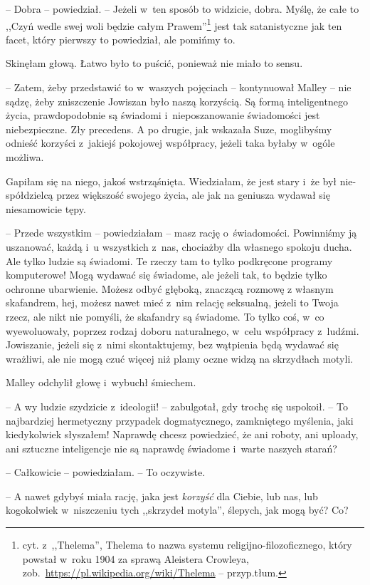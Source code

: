 \documentclass[oneside,polish,11pt,sfheadings]{mwbk}
\begin{document}
-- Dobra -- powiedział. -- Jeżeli w~ten sposób to widzicie,
dobra. Myślę, że całe to ,,Czyń wedle swej woli będzie całym
Prawem''\footnote{cyt. z~,,Thelema'', Thelema to nazwa systemu
religijno-filozoficznego, który powstał w~roku 1904 za sprawą Aleistera
Crowleya, zob.~\url{https://pl.wikipedia.org/wiki/Thelema} -- przyp.tłum.} jest tak satanistyczne jak ten facet, który pierwszy to
powiedział, ale pomińmy to.

Skinęłam głową. Łatwo było to puścić, ponieważ nie miało to sensu.

-- Zatem, żeby przedstawić to w~waszych pojęciach -- kontynuował Malley -- nie sądzę, żeby zniszczenie Jowiszan było naszą korzyścią. Są formą
inteligentnego życia, prawdopodobnie są świadomi i~nieposzanowanie
świadomości jest niebezpieczne. Zły precedens. A po drugie, jak wskazała
Suze, moglibyśmy odnieść korzyści z~jakiejś pokojowej współpracy, jeżeli
taka byłaby w~ogóle możliwa.

Gapiłam się na niego, jakoś wstrząśnięta. Wiedziałam, że jest stary i~że
był nie-spółdzielcą przez większość swojego życia, ale jak na geniusza
wydawał się niesamowicie tępy.

-- Przede wszystkim -- powiedziałam -- masz rację o~świadomości. Powinniśmy
ją uszanować, każdą i~u wszystkich z~nas, chociażby dla własnego spokoju
ducha. Ale tylko ludzie są świadomi. Te rzeczy tam to tylko podkręcone
programy komputerowe! Mogą wydawać się świadome, ale jeżeli tak, to
będzie tylko ochronne ubarwienie. Możesz odbyć głęboką, znaczącą rozmowę
z własnym skafandrem, hej, możesz nawet mieć z~nim relację seksualną,
jeżeli to Twoja rzecz, ale nikt nie pomyśli, że skafandry są świadome.
To tylko coś, w~co wyewoluowały, poprzez rodzaj doboru naturalnego, w~celu współpracy z~ludźmi. Jowiszanie, jeżeli się z~nimi skontaktujemy,
bez wątpienia będą wydawać się wrażliwi, ale nie mogą czuć więcej niż
plamy oczne widzą na skrzydłach motyli.

Malley odchylił głowę i~wybuchł śmiechem.

-- A wy ludzie szydzicie z~ideologii! -- zabulgotał, gdy trochę się
uspokoił. -- To najbardziej hermetyczny przypadek dogmatycznego,
zamkniętego myślenia, jaki kiedykolwiek słyszałem! Naprawdę chcesz
powiedzieć, że ani roboty, ani uploady, ani sztuczne inteligencje nie są
naprawdę świadome i~warte naszych starań?

-- Całkowicie -- powiedziałam. -- To oczywiste.

-- A nawet gdybyś miała rację, jaka jest \textit{korzyść} dla Ciebie, lub
nas, lub kogokolwiek w~niszczeniu tych ,,skrzydeł motyla'', ślepych, jak
mogą być? Co?
\end{document}
